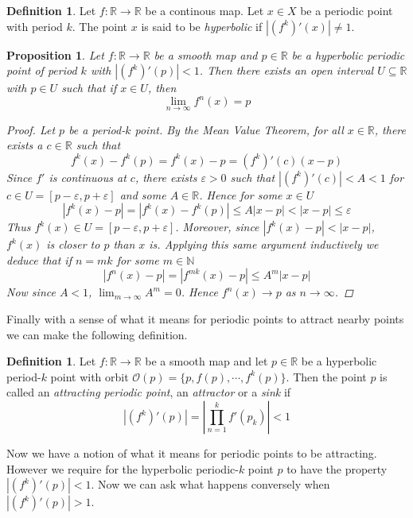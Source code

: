\documentclass[11pt,a4paper,oneside]{memoir}
\theoremstyle{plain}
\newtheorem{prop}[thm]{Proposition}
\theoremstyle{definition}
\newtheorem{defn}[thm]{Definition}
\begin{document}
\begin{defn}
    Let $f: \mathbb{R} \to \mathbb{R}$ be a continous map. Let $x \in X$ be a periodic point with period $k$. The point $x$ is said to be \emph{hyperbolic} if $|(f^k)'(x)| \neq 1$.
\end{defn}

\begin{prop} \label{prop:attractor}
    Let $f: \mathbb{R} \to \mathbb{R}$ be a smooth map and $p \in \mathbb{R}$ be a hyperbolic periodic point of period $k$ with $|(f^k)'(p)| < 1$. Then there exists an open interval $U \subseteq \mathbb{R}$ with $p \in U$ such that if $x \in U$, then \[ \lim_{n \to \infty} f^n(x) = p \]

    \begin{proof}
        Let $p$ be a period-$k$ point. By the Mean Value Theorem, for all $x \in \mathbb{R}$, there exists a $c \in \mathbb{R}$ such that \[f^k(x) - f^k(p) = f^k(x) - p = (f^k)'(c)(x-p)\] Since $f'$ is continuous at $c$, there exists $\varepsilon > 0$ such that $|(f^k)'(c)| < A < 1$ for $c \in U = [p - \varepsilon, p + \varepsilon]$ and some $A \in \mathbb{R}$. Hence for some $x \in U$ \[|f^k(x) - p| = |f^k(x) - f^k(p)| \leq A|x-p| < |x-p| \leq \varepsilon\] Thus $f^k(x) \in U = [p - \varepsilon, p + \varepsilon]$. Moreover, since $|f^k(x) - p| < |x - p|$, $f^k(x)$ is closer to $p$ than $x$ is. Applying this same argument inductively we deduce that if $n = mk$ for some $m \in \mathbb{N}$ \[|f^n(x) - p| = |f^{mk}(x) - p| \leq A^m|x - p|\] Now since $A < 1$, $\lim_{m \to \infty}A^m = 0$. Hence $f^n(x) \to p$ as $n \to \infty$. 
    \end{proof}
\end{prop}

Finally with a sense of what it means for periodic points to attract nearby points we can make the following definition.

\begin{defn} \label{def:attractor}
    Let $f: \mathbb{R} \to \mathbb{R}$ be a smooth map and let $p \in \mathbb{R}$ be a hyperbolic period-$k$ point with orbit $\mathcal{O}(p) = \lbrace p, f(p), \cdots, f^k(p) \rbrace$. Then the point $p$ is called an \emph{attracting periodic point}, an \emph{attractor} or a \emph{sink} if \[|(f^k)'(p)| = \left\lvert \prod_{n = 1}^k f'(p_k) \right\rvert < 1\]
\end{defn}

Now we have a notion of what it means for periodic points to be attracting. However we require for the hyperbolic periodic-$k$ point $p$ to have the property $|(f^k)'(p)| < 1$. Now we can ask what happens conversely when $|(f^k)'(p)| > 1$.
\end{document}
